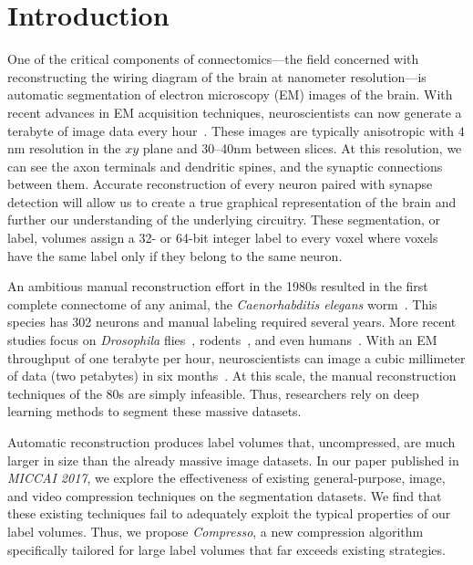 \section{Introduction}

One of the critical components of connectomics---the field concerned with reconstructing the wiring diagram of the brain at nanometer resolution---is automatic segmentation of electron microscopy (EM) images of the brain.
With recent advances in EM acquisition techniques, neuroscientists can now generate a terabyte of image data every hour~\cite{richard2016imaging}.
These images are typically anisotropic with $4$nm resolution in the $xy$ plane and \numrange{30}{40}nm between slices. 
At this resolution, we can see the axon terminals and dendritic spines, and the synaptic connections between them.
Accurate reconstruction of every neuron paired with synapse detection will allow us to create a true graphical representation of the brain and further our understanding of the underlying circuitry.
These segmentation, or label, volumes assign a 32- or 64-bit integer label to every voxel where voxels have the same label only if they belong to the same neuron.

An ambitious manual reconstruction effort in the 1980s resulted in the first complete connectome of any animal, the \textit{Caenorhabditis elegans} worm~\cite{white1986structure}. 
This species has 302 neurons and manual labeling required several years.
More recent studies focus on \textit{Drosophila} flies~\cite{jovanic2016competitive,takemura2015synaptic},  rodents~\cite{richard2016imaging}, and even humans~\cite{sporns2005human}. 
With an EM throughput of one terabyte per hour, neuroscientists can image a cubic millimeter of data (two petabytes) in six months~\cite{suissa2016automatic}. 
At this scale, the manual reconstruction techniques of the 80s are simply infeasible.
Thus, researchers rely on deep learning methods to segment these massive datasets.

Automatic reconstruction produces label volumes that, uncompressed, are much larger in size than the already massive image datasets.
In our paper published in \textit{MICCAI 2017}, we explore the effectiveness of existing general-purpose, image, and video compression techniques on the segmentation datasets.
We find that these existing techniques fail to adequately exploit the typical properties of our label volumes.
Thus, we propose \textit{Compresso}, a new compression algorithm specifically tailored for large label volumes that far exceeds existing strategies.

